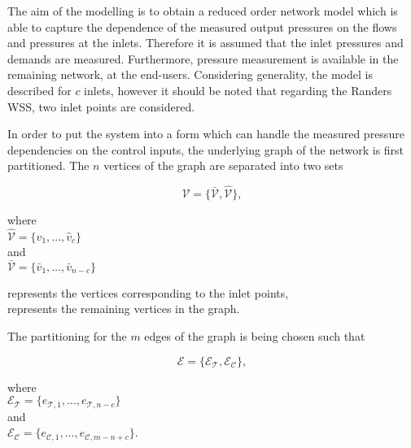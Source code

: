 The aim of the modelling is to obtain a reduced order network model which is able to capture the dependence of the measured output pressures on the flows and pressures at the inlets. Therefore it is assumed that the inlet pressures and demands are measured. Furthermore, pressure measurement is available in the remaining network, at the end-users. Considering generality, the model is described for $c$ inlets, however it should be noted that regarding the Randers WSS, two inlet points are considered. 

In order to put the system into a form which can handle the measured pressure dependencies on the control inputs, the underlying graph of the network is first partitioned. The $n$ vertices of the graph are separated into two sets

\begin{equation}
  \label{vertices1}
  \mathcal{V} = \{\bar{\mathcal{V}}, \hat{\mathcal{V}} \}, 
\end{equation}

\begin{minipage}[t]{0.3\textwidth}
where\\
\hspace*{8mm} $\hat{\mathcal{V}} = \{\hat{v}_1, ..., \hat{v}_c\}$\\
and \\
\hspace*{8mm} $\bar{\mathcal{V}} = \{\bar{v}_1, ..., \bar{v}_{n-c}\}$ 
\end{minipage}
\begin{minipage}[t]{0.55\textwidth}
\vspace*{2mm}
 represents the vertices corresponding to the inlet points,\\
 represents the remaining vertices in the graph.
\end{minipage}

The partitioning for the $m$ edges of the graph is being chosen such that

\begin{equation}
  \label{edges1}
  \mathcal{E} = \{\mathcal{E_{\mathcal{T}}}, \mathcal{E_{\mathcal{C}}} \},
\end{equation}

\begin{minipage}[t]{0.35\textwidth}
where\\
\hspace*{8mm} $\mathcal{E_{\mathcal{T}}} = \{e_{\mathcal{T},1}, ..., e_{\mathcal{T},n-c}\}$\\
and\\
\hspace*{8mm} $\mathcal{E_{\mathcal{C}}} = \{e_{\mathcal{C},1}, ..., e_{\mathcal{C},m-n+c}\}$. 
\end{minipage}

